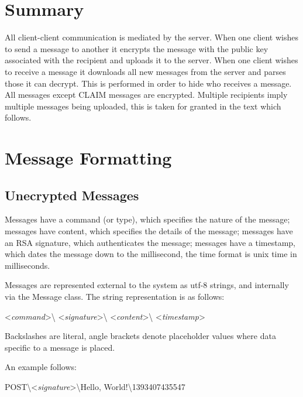 \section{Summary}
All client-client communication is mediated by the server. When one client
wishes to send a message to another it encrypts the message with the public key
associated with the recipient and uploads it to the server. When one client
wishes to receive a message it downloads all new messages from the server and
parses those it can decrypt. This is performed in order to hide who receives a
message. All messages except CLAIM messages are encrypted. Multiple recipients
imply multiple messages being uploaded, this is taken for granted in the text
which follows.

\section{Message Formatting}
\subsection{Unecrypted Messages}
Messages have a command (or type), which specifies the nature of the message;
messages have content, which specifies the details of the message;
messages have an RSA signature, which authenticates the message;
messages have a timestamp, which dates the message down to the millisecond, the
time format is unix time in milliseconds.

Messages are represented external to the system as utf-8 strings, and internally
via the Message class. The string representation is as follows:\\

\begin{center}
\textless \textit{command}\textgreater\textbackslash
\textless \textit{signature}\textgreater\textbackslash
\textless \textit{content}\textgreater\textbackslash
\textless \textit{timestamp}\textgreater
\end{center}

Backslashes are literal, angle brackets denote placeholder values where data
specific to a message is placed.

An example follows:
\begin{center}
POST\textbackslash\textless\textit{signature}\textgreater\textbackslash Hello, World!\textbackslash 1393407435547
\end{center}

